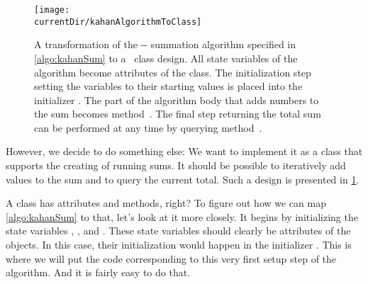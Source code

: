 \begin{figure}%
\centering%
\texttt{[image: \\currentDir/kahanAlgorithmToClass]}%
\caption{A transformation of the \citeauthor{K1965PFRORTE}-\citeauthor{B1968NSIMA}-\citeauthor{N1974REVZSES} summation algorithm specified in \cref{algo:kahanSum} to a \python\ class design. %
All state variables of the algorithm become attributes of the class. %
The initialization step setting the variables to their starting values is placed into the initializer . %
The part of the algorithm body that adds numbers to the sum becomes method~. %
The final step returning the total sum can be performed at any time by querying method~.%
}%
\label{fig:kahanAlgorithmToClass}%
\afterpage{\clearpage}%
\end{figure}%
%
%
%
%
%
%
%
%
%

However, we decide to do something else:
We want to implement it as a class  that supports the creating of running sums.
It should be possible to iteratively add values to the sum and to query the current total.
Such a design is presented in \cref{fig:kahanAlgorithmToClass}.

A class has attributes and methods, right?
To figure out how we can map \cref{algo:kahanSum} to that, let's look at it more closely.
It begins by initializing the state variables , , and .
These state variables should clearly be attributes of the objects.
In this case, their initialization would happen in the initializer .
This is where we will put the code corresponding to this very first setup step of the algorithm.
And it is fairly easy to do that.


